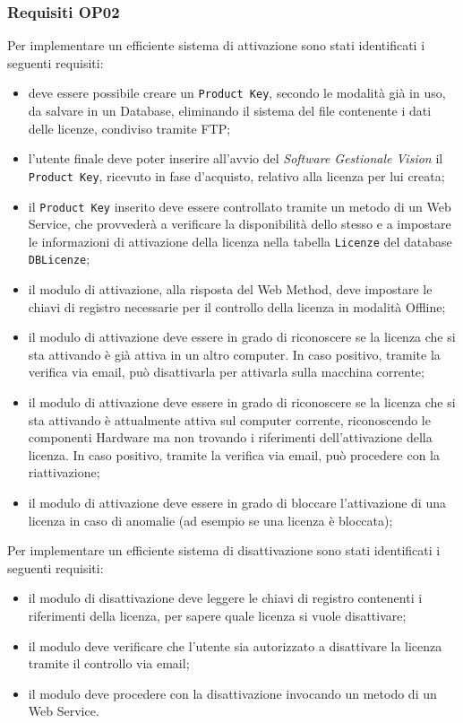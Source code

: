 \subsubsection{Requisiti OP02} 
Per implementare un efficiente sistema di attivazione sono stati identificati i seguenti requisiti:
\begin{itemize}
\item deve essere possibile creare un \texttt{Product Key}, secondo le modalità già in uso, da salvare in un Database, eliminando il sistema del file contenente i dati delle licenze, condiviso tramite FTP;
\item l'utente finale deve poter inserire all'avvio del \textit{Software Gestionale Vision} il \texttt{Product Key}, ricevuto in fase d'acquisto, relativo alla licenza per lui creata;
\item il \texttt{Product Key} inserito deve essere controllato tramite un metodo di un Web Service, che provvederà a verificare la disponibilità dello stesso e a impostare le informazioni di attivazione della licenza nella tabella \texttt{Licenze} del database \texttt{DBLicenze};
\item il modulo di attivazione, alla risposta del Web Method, deve impostare le chiavi di registro necessarie per il controllo della licenza in modalità Offline;
\item il modulo di attivazione deve essere in grado di riconoscere se la licenza che si sta attivando è già attiva in un altro computer. In caso positivo, tramite la verifica via email, può disattivarla per attivarla sulla macchina corrente;
\item il modulo di attivazione deve essere in grado di riconoscere se la licenza che si sta attivando è attualmente attiva sul computer corrente, riconoscendo le componenti Hardware ma non trovando i riferimenti dell'attivazione della licenza. In caso positivo, tramite la verifica via email, può procedere con la riattivazione;
\item il modulo di attivazione deve essere in grado di bloccare l'attivazione di una licenza in caso di anomalie (ad esempio se una licenza è bloccata);

\end{itemize} 

Per implementare un efficiente sistema di disattivazione sono stati identificati i seguenti requisiti:


\begin{itemize}
\item il modulo di disattivazione deve leggere le chiavi di registro contenenti i riferimenti della licenza, per sapere quale licenza si vuole disattivare;
\item il modulo deve verificare che l'utente sia autorizzato a disattivare la licenza tramite il controllo via email;
\item il modulo deve procedere con la disattivazione invocando un metodo di un Web Service.
\end{itemize}

